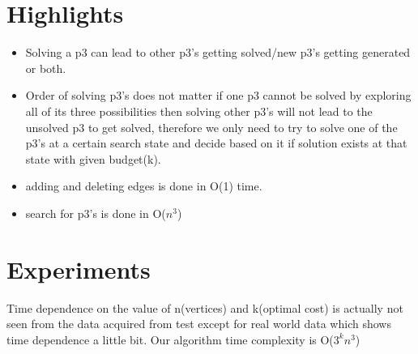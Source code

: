 \documentclass[5p,twocolumn,final]{elsarticle}
\begin{document}
\section{Highlights}
	\begin{itemize}
		\item Solving a p3 can lead to other p3's getting solved/new p3's getting generated or both.
		\item Order of solving p3's does not matter if one p3 cannot be solved by exploring all of its three possibilities then solving other p3's will not lead to the unsolved p3 to get solved, therefore we only need to try to solve one of the p3's at a certain search state and decide based on it if solution exists at that state with given budget(k).
		\item adding and deleting edges is done in O(1) time.
		\item search for p3's is done in O($n^{3}$)
	\end{itemize}

\section{Experiments}
Time dependence on the value of n(vertices) and k(optimal cost) is actually not seen from the data acquired from test except for real world data which shows time dependence a little bit. Our algorithm time complexity is O($3^{k}n^{3}$)




\onecolumn
\end{document}
